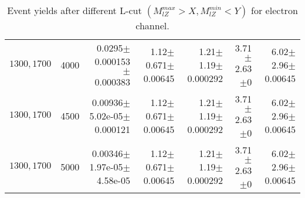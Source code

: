 \documentclass[]{article}
\begin{document}
\begin{table}
\begin{center}
{\begin{tabular}{ |r|r|r|r|r|r|r|}
$1300, 1700$ & 4000 & 0.0295$\pm$0.000153$\pm$0.000383 & 1.12$\pm$0.671$\pm$0.00645 & 1.21$\pm$1.19$\pm$0.000292 & 3.71$\pm$2.63$\pm$0 & 6.02$\pm$2.96$\pm$0.00645 \\
$1300, 1700$ & 4500 & 0.00936$\pm$5.02e-05$\pm$0.000121 & 1.12$\pm$0.671$\pm$0.00645 & 1.21$\pm$1.19$\pm$0.000292 & 3.71$\pm$2.63$\pm$0 & 6.02$\pm$2.96$\pm$0.00645 \\
$1300, 1700$ & 5000 & 0.00346$\pm$1.97e-05$\pm$4.58e-05 & 1.12$\pm$0.671$\pm$0.00645 & 1.21$\pm$1.19$\pm$0.000292 & 3.71$\pm$2.63$\pm$0 & 6.02$\pm$2.96$\pm$0.00645 \\
\hline 
\end{tabular}
}
\end{center}
\caption{Event yields after different L-cut $(M_{lZ}^{max} > X, M_{lZ}^{min} < Y)$ for electron channel.}
\end{table}
\end{document}
